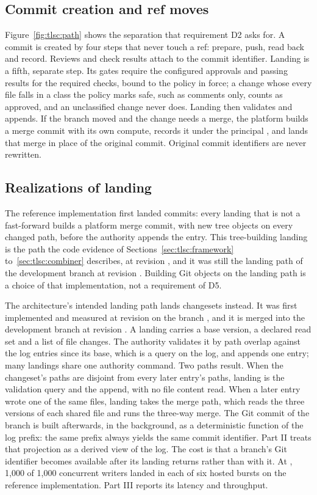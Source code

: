 \documentclass[11pt,letterpaper]{article}
\theoremstyle{definition}
\theoremstyle{remark}
\begin{document}
\subsection{Commit creation and ref moves}

Figure~\ref{fig:tlsc:path} shows the separation that requirement D2 asks for. A commit is created by four steps that never touch a ref: prepare, push, read back and record. Reviews and check results attach to the commit identifier. Landing is a fifth, separate step. Its gates require the configured approvals and passing results for the required checks, bound to the policy in force; a change whose every file falls in a class the policy marks safe, such as comments only, counts as approved, and an unclassified change never does. Landing then validates and appends. If the branch moved and the change needs a merge, the platform builds a merge commit with its own compute, records it under the principal , and lands that merge in place of the original commit. Original commit identifiers are never rewritten.

\subsection{Realizations of landing}
\label{sec:tlsc:n11}

The reference implementation first landed commits: every landing that is not a fast-forward builds a platform merge commit, with new tree objects on every changed path, before the authority appends the entry. This tree-building landing is the path the code evidence of Sections~\ref{sec:tlsc:framework} to~\ref{sec:tlsc:combiner} describes, at revision , and it was still the landing path of the development branch at revision . Building Git objects on the landing path is a choice of that implementation, not a requirement of D5.

The architecture's intended landing path lands changesets instead. It was first implemented and measured at revision  on the branch , and it is merged into the development branch at revision . A landing carries a base version, a declared read set and a list of file changes. The authority validates it by path overlap against the log entries since its base, which is a query on the log, and appends one entry; many landings share one authority command. Two paths result. When the changeset's paths are disjoint from every later entry's paths, landing is the validation query and the append, with no file content read. When a later entry wrote one of the same files, landing takes the merge path, which reads the three versions of each shared file and runs the three-way merge. The Git commit of the branch is built afterwards, in the background, as a deterministic function of the log prefix: the same prefix always yields the same commit identifier. Part II treats that projection as a derived view of the log. The cost is that a branch's Git identifier becomes available after its landing returns rather than with it. At , 1,000 of 1,000 concurrent writers landed in each of six hosted bursts on the reference implementation. %
Part III reports its latency and throughput.
\end{document}
